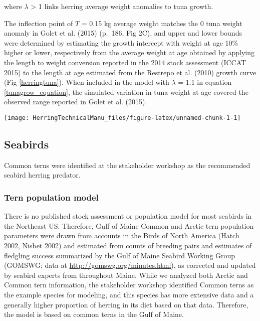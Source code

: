 \documentclass[]{article}
\let\origfigure\figure
\let\endorigfigure\endfigure
\renewenvironment{figure}[1][2] {
    \expandafter\origfigure\expandafter[H]
} {
    \endorigfigure
}
\begin{document}
where \(\lambda\) \textgreater{} 1 links herring average weight
anomalies to tuna growth.

The inflection point of \(T\) = 0.15 kg average weight matches the 0
tuna weight anomaly in Golet et al. (2015) (p.~186, Fig 2C), and upper
and lower bounds were determined by estimating the growth intercept with
weight at age 10\% higher or lower, respectively from the average weight
at age obtained by applying the length to weight conversion reported in
the 2014 stock assessment (ICCAT 2015) to the length at age estimated
from the Restrepo et al. (2010) growth curve (Fig \ref{herringtuna}).
When included in the model with \(\lambda\) = 1.1 in equation
\ref{tunagrow_equation}, the simulated variation in tuna weight at age
covered the observed range reported in Golet et al. (2015).

\begin{figure}

{\centering \texttt{[image: HerringTechnicalManu\_files/figure-latex/unnamed-chunk-1-1]} 

}

\caption{Modeled herring average weight-tuna growth relationship \label{herringtuna}}\label{fig:unnamed-chunk-1}
\end{figure}

\subsection{Seabirds}\label{seabirds}

Common terns were identified at the stakeholder workshop as the
recommended seabird herring predator.

\subsubsection{Tern population model}\label{tern-population-model}

There is no published stock assessment or population model for most
seabirds in the Northeast US. Therefore, Gulf of Maine Common and Arctic
tern population parameters were drawn from accounts in the Birds of
North America (Hatch 2002, Nisbet 2002) and estimated from counts of
breeding pairs and estimates of fledgling success summarized by the Gulf
of Maine Seabird Working Group (GOMSWG; data at
\url{http://gomswg.org/minutes.html}), as corrected and updated by
seabird experts from throughout Maine. While we analyzed both Arctic and
Common tern information, the stakeholder workshop identified Common
terns as the example species for modeling, and this species has more
extensive data and a generally higher proportion of herring in its diet
based on that data. Therefore, the model is based on common terns in the
Gulf of Maine.
\end{document}
